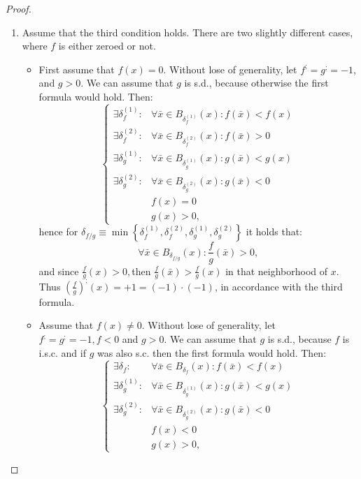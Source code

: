 \documentclass[11pt]{book}
\begin{document}
\begin{proof}
\begin{enumerate}
\item Assume that the third condition holds. There are two slightly different cases, where $f$ is either zeroed or not.
\begin{itemize}
\item First assume that $f\left(x\right)=0$. Without lose of generality, let $f^{;}=g^{;}=-1$, and $g>0$. We can assume that $g$ is s.d., because otherwise the first formula would hold. Then:
$$\begin{cases}\exists\delta_{f}^{\left(1\right)}: & \forall\bar{x}\in B_{\delta_{f}^{\left(1\right)}}\left(x\right):f\left(\bar{x}\right)< f\left(x\right)\\ \exists\delta_{f}^{\left(2\right)}: & \forall\bar{x}\in B_{\delta_{f}^{\left(2\right)}}\left(x\right):f\left(\bar{x}\right)>0\\\exists\delta_{g}^{\left(1\right)}: & \forall\bar{x}\in B_{\delta_{g}^{\left(1\right)}}\left(x\right):g\left(\bar{x}\right)< g\left(x\right)\\\exists\delta_{g}^{\left(2\right)}: & \forall\bar{x}\in B_{\delta_{g}^{\left(2\right)}}\left(x\right):g\left(\bar{x}\right)<0\\ & f\left(x\right)=0\\ & g\left(x\right)>0,\end{cases}$$
hence for $\delta_{f/g}\equiv\min\left\{ \delta_{f}^{\left(1\right)},\delta_{f}^{\left(2\right)},\delta_{g}^{\left(1\right)},\delta_{g}^{\left(2\right)}\right\}$ it holds that:
$$\forall\bar{x}\in B_{\delta_{f/g}}\left(x\right):\frac{f}{g}\left(\bar{x}\right)>0,$$
and since $\frac{f}{g}\left(x\right)>0,$then $\frac{f}{g}\left(\bar{x}\right)>\frac{f}{g}\left(x\right)$ in that neighborhood of $x$. Thus $\left(\frac{f}{g}\right)^{;}\left(x\right)=+1=\left(-1\right)\cdot\left(-1\right)$, in accordance with the third formula.
\item Assume that $f\left(x\right)\neq0$. Without lose of generality, let $f^{;}=g^{;}=-1,f<0$ and $g>0$. We can assume that $g$ is s.d., because $f$ is i.s.c. and if $g$ was also s.c. then the first formula would hold. Then:
$$\begin{cases}\exists\delta_{f}: & \forall\bar{x}\in B_{\delta_{f}}\left(x\right):f\left(\bar{x}\right)< f\left(x\right)\\\exists\delta_{g}^{\left(1\right)}: & \forall\bar{x}\in B_{\delta_{g}^{\left(1\right)}}\left(x\right):g\left(\bar{x}\right)< g\left(x\right)\\\exists\delta_{g}^{\left(2\right)}: & \forall\bar{x}\in B_{\delta_{g}^{\left(2\right)}}\left(x\right):g\left(\bar{x}\right)<0\\& f\left(x\right)<0\\ & g\left(x\right)>0,\end{cases}$$

\end{itemize}
\end{enumerate}
\end{proof}
\end{document}
